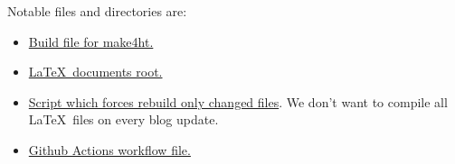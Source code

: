 \documentclass{article}
\begin{document}
Notable files and directories are:

\begin{itemize}
  \item \href{https://github.com/michal-h21/testblog/blob/main/.make4ht}{Build file for make4ht.}
  \item \href{https://github.com/michal-h21/testblog/tree/main/texposts}{\LaTeX\ documents root.}
  \item \href{https://github.com/michal-h21/testblog/blob/main/texposts/rebuild.sh}{Script which forces rebuild only changed files}.
    We don't want to compile all \LaTeX\ files on every blog update. 
  \item \href{https://github.com/michal-h21/testblog/blob/main/.github/workflows/main.yml}{Github Actions workflow file.}
\end{itemize}
\end{document}

